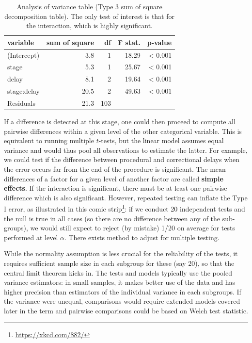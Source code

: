 \documentclass[
  11pt,
  letterpaper,
]{book}
\renewcommand{\href}[2]{#2\footnote{\url{#1}}}
\theoremstyle{definition}
\theoremstyle{definition}
\theoremstyle{definition}
\theoremstyle{remark}
\begin{document}
\begin{table}

\caption{\label{tab:summarydelaywinteraction}Analysis of variance table (Type 3 sum of square decomposition table). The only test of interest is that for the interaction, which is highly significant.}
\centering
\begin{tabular}[t]{lrrrr}
\toprule
variable & sum of square & df & F stat. & p-value\\
\midrule
(Intercept) & 3.8 & 1 & 18.29 & < 0.001\\
stage & 5.3 & 1 & 25.67 & < 0.001\\
delay & 8.1 & 2 & 19.64 & < 0.001\\
stage:delay & 20.5 & 2 & 49.63 & < 0.001\\
Residuals & 21.3 & 103 &  & \\
\bottomrule
\end{tabular}
\end{table}

If a difference is detected at this stage, one could then proceed to compute all pairwise differences within a given level of the other categorical variable. This is equivalent to running multiple \(t\)-tests, but the linear model assumes equal variance and would thus pool all observations to estimate the latter. For example, we could test if the difference between procedural and correctional delays when the error occurs far from the end of the procedure is significant. The mean differences of a factor for a given level of another factor are called \textbf{simple effects}. If the interaction is significant, there must be at least one pairwise difference which is also significant. However, repeated testing can inflate the Type I error, \href{https://xkcd.com/882/}{as illustrated in this comic strip}: if we conduct 20 independent tests and the null is true in all cases (so there are no difference between any of the sub-groups), we would still expect to reject (by mistake) 1/20 on average for tests performed at level \(\alpha\). There exists method to adjust for multiple testing.

While the normality assumption is less crucial for the reliability of the tests, it requires sufficient sample size in each subgroup for these (say 20), so that the central limit theorem kicks in. The tests and models typically use the pooled variance estimators: in small samples, it makes better use of the data and has higher precision than estimators of the individual variance in each subgroups. If the variance were unequal, comparisons would require extended models covered later in the term and pairwise comparisons could be based on Welch test statistic.
\end{document}
